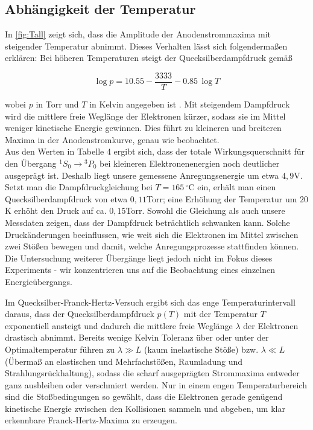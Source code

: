 \subsection*{Abhängigkeit der Temperatur}

In \cref{fig:Tall} zeigt sich, dass die Amplitude der Anodenstrommaxima mit steigender Temperatur abnimmt. Dieses Verhalten lässt sich folgendermaßen erklären: Bei höheren Temperaturen steigt der Quecksilberdampfdruck gemäß

\begin{equation}
\log p = 10.55 - \frac{3333}{T} - 0.85\,\log T
\end{equation}

\noindent wobei $p$ in Torr und $T$ in Kelvin angegeben ist \cite{praktikum4}. Mit steigendem Dampfdruck wird die mittlere freie Weglänge der Elektronen kürzer, sodass sie im Mittel weniger kinetische Energie gewinnen. Dies führt zu kleineren und breiteren Maxima in der Anodenstromkurve, genau wie beobachtet.
\vspace{0.3cm}\\
Aus den Werten in Tabelle 4 ergibt sich, dass der totale Wirkungsquerschnitt für den Übergang $^1S_0 \to {}^3P_0$ bei kleineren Elektronenenergien noch deutlicher ausgeprägt ist. Deshalb liegt unsere gemessene Anregungsenergie um etwa $4,9$V.
\vspace{0.3cm}\\
Setzt man die Dampfdruckgleichung bei $T = 165\,^\circ\mathrm{C}$ ein, erhält man einen Quecksilberdampfdruck von etwa $0,11$Torr; eine Erhöhung der Temperatur um $20$K erhöht den Druck auf ca. $0,15$Torr. Sowohl die Gleichung als auch unsere Messdaten zeigen, dass der Dampfdruck beträchtlich schwanken kann. Solche Druckänderungen beeinflussen, wie weit sich die Elektronen im Mittel zwischen zwei Stößen bewegen und damit, welche Anregungsprozesse stattfinden können. Die Untersuchung weiterer Übergänge liegt jedoch nicht im Fokus dieses Experiments - wir konzentrieren uns auf die Beobachtung eines einzelnen Energieübergangs.


Im Quecksilber-Franck-Hertz-Versuch ergibt sich das enge Temperaturintervall daraus, dass der Quecksilber­dampfdruck $p(T)$ mit der Temperatur $T$ exponentiell ansteigt und dadurch die mittlere freie Weglänge $\lambda$ der Elektronen drastisch abnimmt. Bereits wenige Kelvin Toleranz über oder unter der Optimaltemperatur führen zu $\lambda\gg L$ (kaum inelastische Stöße) bzw. $\lambda\ll L$ (Übermaß an elastischen und Mehrfachstößen, Raumladung und Strahlungsrückhaltung), sodass die scharf ausgeprägten Strommaxima entweder ganz ausbleiben oder verschmiert werden. Nur in einem engen Temperaturbereich sind die Stoßbedingungen so gewählt, dass die Elektronen gerade genügend kinetische Energie zwischen den Kollisionen sammeln und abgeben, um klar erkennbare Franck-Hertz-Maxima zu erzeugen.
